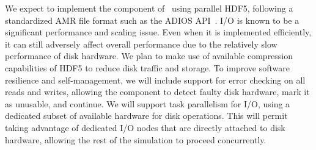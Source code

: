 \documentclass[11pt,letterpaper]{article}
\begin{document}

%
We expect to implement the  component of \cello\ using
parallel HDF5, following a standardized AMR file format such as the
ADIOS API~\cite{LoKl08}.  I/O is known to be a significant performance
and scaling issue.  Even when it is implemented efficiently, it can
still adversely affect overall performance due to the relatively slow
performance of disk hardware.  We plan to make use of available
compression capabilities of HDF5 to reduce disk traffic and storage.
To improve software resilience and self-management, we will include support for error
checking on all reads and writes, allowing the  component
to detect faulty disk hardware, mark it as unusable, and continue.  We
will support task parallelism for I/O, using a dedicated subset of
available hardware for disk operations.  This will permit taking
advantage of dedicated I/O nodes that are directly attached to disk
hardware, allowing the rest of the simulation to proceed
concurrently.
\end{document}
